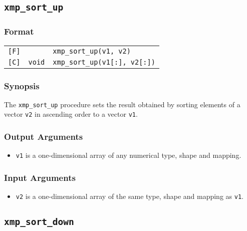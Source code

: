 \subsection{\tt xmp\_sort\_up}

\subsubsection*{Format}

\begin{tabular}{lll}

\verb![F]!&            & {\tt xmp\_sort\_up(v1, v2)}\\

\verb![C]!& {\tt void} & {\tt xmp\_sort\_up(v1[:], v2[:])}\\

\end{tabular}

\subsubsection*{Synopsis}

The {\tt xmp\_sort\_up} procedure sets the result obtained by sorting
elements of a vector {\tt v2} in ascending order to a vector {\tt v1}.

\subsubsection*{Output Arguments}
\begin{itemize}
 \item {\tt v1} is a one-dimensional array of any numerical type,
       shape and mapping.
\end{itemize}

\subsubsection*{Input Arguments}
\begin{itemize}
 \item {\tt v2} is a one-dimensional array of the same type, shape and
       mapping as {\tt v1}.
\end{itemize}


\subsection{\tt xmp\_sort\_down}

